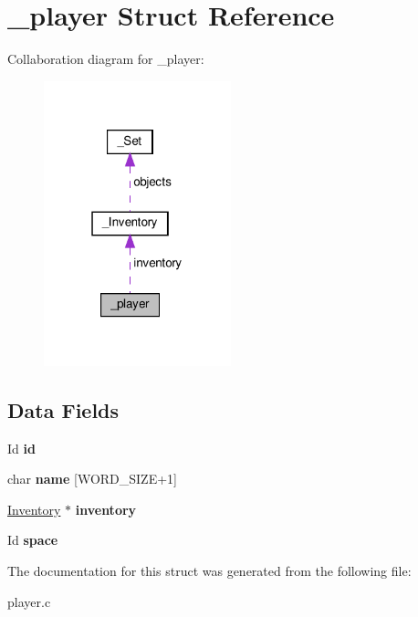 \hypertarget{struct__player}{}\section{\+\_\+player Struct Reference}
\label{struct__player}


Collaboration diagram for \+\_\+player\+:
\nopagebreak
\begin{figure}[H]
\begin{center}
\leavevmode
\includegraphics[width=154pt]{struct__player__coll__graph}
\end{center}
\end{figure}
\subsection*{Data Fields}
\begin{DoxyCompactItemize}
\item 
\mbox{\label{struct__player_ab64e42ee1e2ff021597e47767c7d92bc}} 
Id {\bfseries id}
\item 
\mbox{\label{struct__player_ae558caac46e1834dac12a15816da5bb3}} 
char {\bfseries name} \mbox{[}W\+O\+R\+D\+\_\+\+S\+I\+ZE+1\mbox{]}
\item 
\mbox{\label{struct__player_ac98269416f1f48d6be218d732b3e9bfd}} 
\hyperlink{struct__Inventory}{Inventory} $\ast$ {\bfseries inventory}
\item 
\mbox{\label{struct__player_a92ec50e0c6a918578b9749b4996423f9}} 
Id {\bfseries space}
\end{DoxyCompactItemize}


The documentation for this struct was generated from the following file\+:\begin{DoxyCompactItemize}
\item 
player.\+c\end{DoxyCompactItemize}
